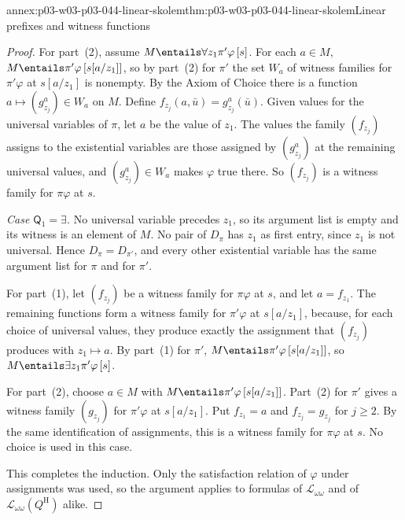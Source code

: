 \begin{annexitem}{annex:p03-w03-p03-044-linear-skolem}{thm:p03-w03-p03-044-linear-skolem}{Linear prefixes and witness functions}
\begin{proof}
For part~(2), assume \(M\entails\forall z_1\pi'\varphi\,[s]\).  For each
\(a\in M\), \(M\entails\pi'\varphi\,[s[a/z_1]]\), so by part~(2) for
\(\pi'\) the set \(W_a\) of witness families for \(\pi'\varphi\) at
\(s[a/z_1]\) is nonempty.  By the Axiom of Choice there is a function
\(a\mapsto(g^a_{z_j})\in W_a\) on \(M\).  Define
\(f_{z_j}(a,\bar u)=g^a_{z_j}(\bar u)\).  Given values for the universal
variables of \(\pi\), let \(a\) be the value of \(z_1\).  The values the
family \((f_{z_j})\) assigns to the existential variables are those
assigned by \((g^a_{z_j})\) at the remaining universal values, and
\((g^a_{z_j})\in W_a\) makes \(\varphi\) true there.  So \((f_{z_j})\) is a
witness family for \(\pi\varphi\) at \(s\).

\emph{Case \(\mathsf Q_1=\exists\).}  No universal variable precedes
\(z_1\), so its argument list is empty and its witness is an element of
\(M\).  No pair of \(D_\pi\) has \(z_1\) as first entry, since \(z_1\) is
not universal.  Hence \(D_\pi=D_{\pi'}\), and every other existential
variable has the same argument list for \(\pi\) and for \(\pi'\).

For part~(1), let \((f_{z_j})\) be a witness family for \(\pi\varphi\) at
\(s\), and let \(a=f_{z_1}\).  The remaining functions form a witness family
for \(\pi'\varphi\) at \(s[a/z_1]\), because, for each choice of universal
values, they produce exactly the assignment that \((f_{z_j})\) produces
with \(z_1\mapsto a\).  By part~(1) for \(\pi'\),
\(M\entails\pi'\varphi\,[s[a/z_1]]\), so
\(M\entails\exists z_1\pi'\varphi\,[s]\).

For part~(2), choose \(a\in M\) with \(M\entails\pi'\varphi\,[s[a/z_1]]\).
Part~(2) for \(\pi'\) gives a witness family \((g_{z_j})\) for
\(\pi'\varphi\) at \(s[a/z_1]\).  Put \(f_{z_1}=a\) and \(f_{z_j}=g_{z_j}\)
for \(j\ge2\).  By the same identification of assignments, this is a
witness family for \(\pi\varphi\) at \(s\).  No choice is used in this case.

This completes the induction.  Only the satisfaction relation of
\(\varphi\) under assignments was used, so the argument applies to formulas
of \(\mathscr L_{\omega\omega}\) and of
\(\mathscr L_{\omega\omega}(Q^{\mathrm H})\) alike.
\end{proof}
\end{annexitem}


